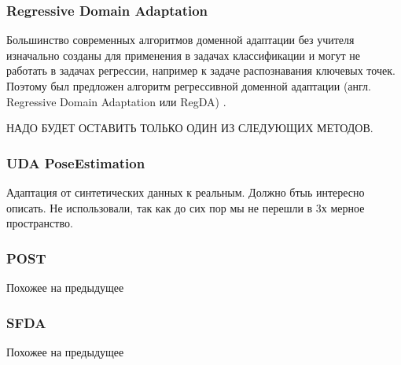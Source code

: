 \subsubsection*{Regressive Domain Adaptation}

Большинство современных алгоритмов доменной адаптации без учителя изначально созданы для применения в задачах классификации и могут не работать в задачах регрессии, например к задаче распознавания ключевых точек. Поэтому был предложен алгоритм регрессивной доменной адаптации (англ. Regressive Domain Adaptation или RegDA) \cite{regda}.  

\hfill \break

НАДО БУДЕТ ОСТАВИТЬ ТОЛЬКО ОДИН ИЗ СЛЕДУЮЩИХ МЕТОДОВ.

\subsubsection*{UDA PoseEstimation}

Адаптация от синтетических данных к реальным. Должно бтыь интересно описать. Не использовали, так как до сих пор мы не перешли в 3х мерное пространство.

\subsubsection*{POST}

Похожее на предыдущее

\subsubsection*{SFDA}

Похожее на предыдущее


\newpage
